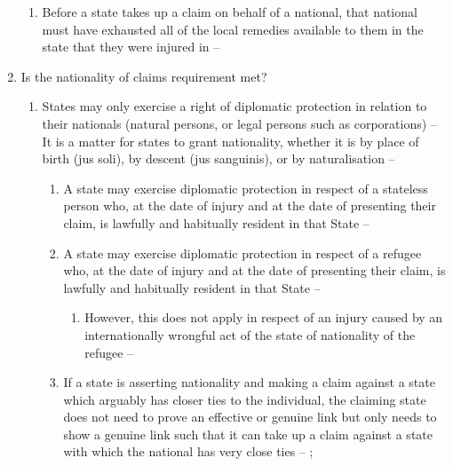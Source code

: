\begin{enumerate}
\begin{enumerate}
        \item Before a state takes up a claim on behalf of a national, that national must have exhausted all of the local remedies available to them in the state that they were injured in -- 
    \end{enumerate}
    \item Is the nationality of claims requirement met?
    \begin{enumerate}
        \item States may only exercise a right of diplomatic protection in relation to their nationals (natural persons, or legal persons such as corporations) -- 
        It is a matter for states to grant nationality, whether it is by place of birth (jus soli), by descent (jus sanguinis), or by naturalisation -- 
        \begin{enumerate}
            \item A state may exercise diplomatic protection in respect of a stateless person who, at the date of injury and at the date of presenting their claim, is lawfully and habitually resident in that State -- 
            \item A state may exercise diplomatic protection in respect of a refugee who, at the date of injury and at the date of presenting their claim, is lawfully and habitually resident in that State -- 
            \begin{enumerate}
                \item However, this does not apply in respect of an injury caused by an internationally wrongful act of the state of nationality of the refugee -- 
            \end{enumerate}
            \item If a state is asserting nationality and making a claim against a state which arguably has closer ties to the individual, the claiming state does not need to prove an effective or genuine link but only needs to show a genuine link such that it can take up a claim against a state with which the national has very close ties -- ; 

\end{enumerate}
\end{enumerate}
\end{enumerate}
